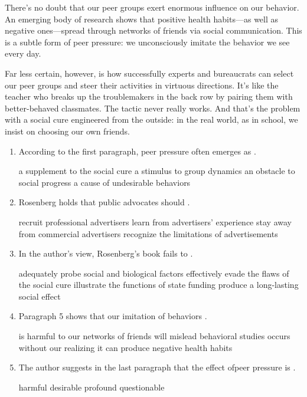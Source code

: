 There's no doubt that our peer groups exert enormous influence on our
behavior. An emerging body of research shows that positive health habits---as well as negative ones---spread through networks of friends via
social communication. This is a subtle form of peer pressure: we
unconsciously imitate the behavior we see every day.

Far less certain, however, is how successfully experts and bureaucrats
can select our peer groups and steer their activities in virtuous
directions. It's like the teacher who breaks up the troublemakers in the
back row by pairing them with better-behaved classmates. The tactic
never really works. And that's the problem with a social cure engineered
from the outside: in the real world, as in school, we insist on choosing
our own friends.

\begin{enumerate}[resume]
	\item
According to the first
paragraph, peer pressure often emerges as \lineread.


\fourchoices
{a supplement to the social cure}
{a stimulus to group dynamics}
{an obstacle to social progress}
{a cause of undesirable behaviors}


\item
Rosenberg holds that public advocates should \lineread.


\fourchoices
{recruit professional advertisers}
{learn from advertisers' experience}
{stay away from commercial advertisers}
{recognize the limitations of advertisements}



\item
 In the author's view, Rosenberg's book fails to \lineread.


\fourchoices
{adequately probe social and biological factors}
{effectively evade the flaws of the social cure}
{illustrate the functions of state funding}
{produce a long-lasting social effect}


\item
Paragraph 5 shows that our imitation of behaviors \lineread.


\fourchoices
{is harmful to our networks of friends}
{will mislead behavioral studies}
{occurs without our realizing it}
{can produce negative health habits}


\item
 The author suggests in the last paragraph that the effect
ofpeer pressure is \lineread.



\fourchoices
{harmful}
{desirable}
{profound}
{questionable}

\end{enumerate}




